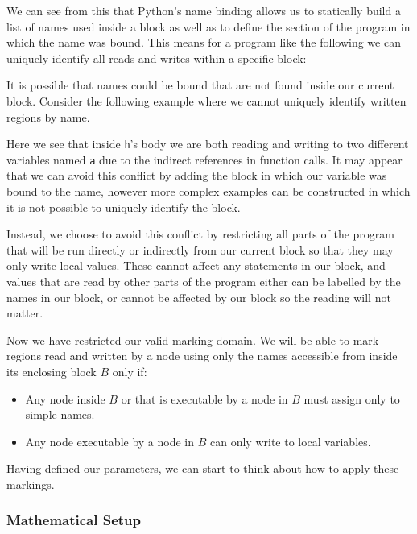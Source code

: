 \documentclass[twoside,a4paper]{report}
\begin{document}
We can see from this that Python's name binding allows us to statically build a list of names used inside a block as well as to define the section of the program in
which the name was bound. This means for a program like the following we can uniquely identify all reads and writes within a specific block:

\pagebreak



It is possible that names could be bound that are not found inside our current block. Consider the following example where we cannot uniquely identify
written regions by name.



Here we see that inside \texttt{h}'s body we are both reading and writing to two different variables named \texttt{a} due to the indirect references in
function calls. It may appear that we can avoid this conflict by adding the block in which our variable was bound to the name, however more complex
examples can be constructed in which it is not possible to uniquely identify the block.

Instead, we choose to avoid this conflict by restricting all parts of the program that will be run directly or indirectly from our current block so that
they may only write local values. These cannot affect any statements in our block, and values that are read by other parts of the program either can be labelled
by the names in our block, or cannot be affected by our block so the reading will not matter.

Now we have restricted our valid marking domain. We will be able to mark regions read and written by a node using only the names accessible from
inside its enclosing block $B$ only if:

\begin{itemize}
\item Any node inside $B$ or that is executable by a node in $B$ must assign only to simple names.
\item Any node executable by a node in $B$ can only write to local variables.
\end{itemize}

Having defined our parameters, we can start to think about how to apply these markings.

\subsubsection{Mathematical Setup}
\end{document}

